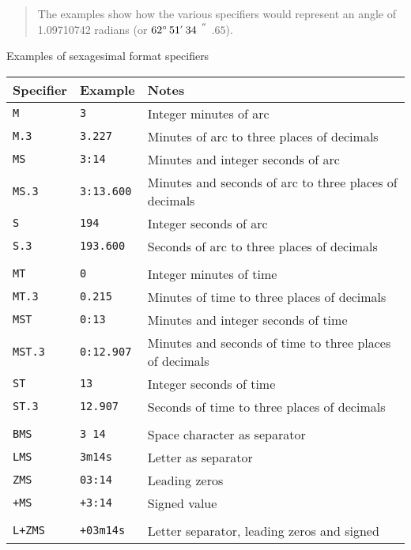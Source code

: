 \documentclass[11pt,twoside]{starlink}
\providecommand{\arcsec} {$\hspace{-0.05em}\raisebox{-0.5ex}
                     {$^{'\hspace{-0.1em}'}$}
                     \hspace{-0.7em}.\hspace{-0.05em}$}
\providecommand{\dms}[4] {$#1^{\circ}\,#2\raisebox{-0.5ex}{$^{'}$}\,#3\arcsec#4$}
\begin{document}
\begin{table}[htbp]
\begin{center}
\begin{quote}
The examples show how the various specifiers would represent an angle of
1.09710742 radians (or \dms{62}{51}{34}{65}).
\end{quote}

\caption{\label{SEXAG_EXAM}Examples of sexagesimal format specifiers}
\end{center}

\end{table}

\begin{table}[htbp]

\begin{center}
\begin{tabular}{lll}
Specifier   & Example        & Notes          \\ \hline
\texttt{M}     & \texttt{3}        & Integer minutes of arc \\
\texttt{M.3}   & \texttt{3.227}    & Minutes of arc to three places of decimals \\
\texttt{MS}    & \texttt{3:14}     & Minutes and integer seconds of arc \\
\texttt{MS.3}  & \texttt{3:13.600} & Minutes and seconds of arc to three places of decimals \\
\texttt{S}     & \texttt{194}      & Integer seconds of arc \\
\texttt{S.3}   & \texttt{193.600}  & Seconds of arc to three places of decimals \\
            &                & \\
\texttt{MT}    & \texttt{0}        & Integer minutes of time \\
\texttt{MT.3}  & \texttt{0.215}    & Minutes of time to three places of decimals \\
\texttt{MST}   & \texttt{0:13}     & Minutes and integer seconds of time\\
\texttt{MST.3} & \texttt{0:12.907} & Minutes and seconds of time to three places of decimals \\
\texttt{ST}    & \texttt{13}       & Integer seconds of time \\
\texttt{ST.3}  & \texttt{12.907}   & Seconds of time to three places of decimals \\
            &                & \\
\texttt{BMS}   & \texttt{3 14}     & Space character as separator \\
\texttt{LMS}   & \texttt{3m14s}    & Letter as separator \\
\texttt{ZMS}   & \texttt{03:14}    & Leading zeros \\
\texttt{+MS}   & \texttt{+3:14}    & Signed value \\
            &                & \\
\texttt{L+ZMS} & \texttt{+03m14s}  & Letter separator, leading zeros and signed \\
\end{tabular}


\end{center}
\end{table}
\end{document}
